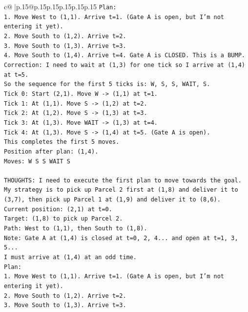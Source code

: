 \documentclass{article}
\begin{document}
{\begin{supertabular}{c@{$\;$}|p{.15\linewidth}@{}p{.15\linewidth}p{.15\linewidth}p{.15\linewidth}p{.15\linewidth}p{.15\linewidth}}
{{{\texttt{Plan:} \\
\texttt{1. Move West to (1,1). Arrive t=1. (Gate A is open, but I'm not entering it yet).} \\
\texttt{2. Move South to (1,2). Arrive t=2.} \\
\texttt{3. Move South to (1,3). Arrive t=3.} \\
\texttt{4. Move South to (1,4). Arrive t=4. Gate A is CLOSED. This is a BUMP.} \\
\texttt{Correction: I need to wait at (1,3) for one tick so I arrive at (1,4) at t=5.} \\
\texttt{So the sequence for the first 5 ticks is: W, S, S, WAIT, S.} \\
\texttt{Tick 0: Start (2,1). Move W {-}> (1,1) at t=1.} \\
\texttt{Tick 1: At (1,1). Move S {-}> (1,2) at t=2.} \\
\texttt{Tick 2: At (1,2). Move S {-}> (1,3) at t=3.} \\
\texttt{Tick 3: At (1,3). Move WAIT {-}> (1,3) at t=4.} \\
\texttt{Tick 4: At (1,3). Move S {-}> (1,4) at t=5. (Gate A is open).} \\
\texttt{This completes the first 5 moves.} \\
\texttt{Position after plan: (1,4).} \\
\texttt{Moves: W S S WAIT S} \\
\\ 
\texttt{THOUGHTS: I need to execute the first plan to move towards the goal. My strategy is to pick up Parcel 2 first at (1,8) and deliver it to (3,7), then pick up Parcel 1 at (1,9) and deliver it to (8,6).} \\
\texttt{Current position: (2,1) at t=0.} \\
\texttt{Target: (1,8) to pick up Parcel 2.} \\
\texttt{Path: West to (1,1), then South to (1,8).} \\
\texttt{Note: Gate A at (1,4) is closed at t=0, 2, 4... and open at t=1, 3, 5...} \\
\texttt{I must arrive at (1,4) at an odd time.} \\
\texttt{Plan:} \\
\texttt{1. Move West to (1,1). Arrive t=1. (Gate A is open, but I'm not entering it yet).} \\
\texttt{2. Move South to (1,2). Arrive t=2.} \\
\texttt{3. Move South to (1,3). Arrive t=3.} \\
}}}
\end{supertabular}}
\end{document}
